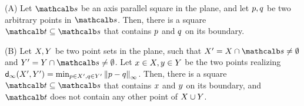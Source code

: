 \documentclass[12pt]{article}%
\begin{document}
\begin{lemma}
    (A) Let $\sqr$ be an axis parallel square in the plane, and let
    $p, q$ be two arbitrary points in $\sqr$. Then, there is a
    square $\sqrA \subseteq \sqr$ that contains $p$ and $q$ on its
    boundary.

    (B) Let $X, Y$ be two point sets in the plane, such that
    $\PSX' = \PSX \cap \sqr \neq \emptyset$ and
    $\PSY' = \PSY \cap \sqr \neq \emptyset$. Let
    $x \in X, y \in Y$ be the two points realizing
    $\dsZ{\infty}{\PSX'}{\PSY'} = \min_{\pa \in \PSX', \pb \in \PSY'}
    \dZ{\infty}{\pa}{\pb}$. Then, there is a square
    $\sqrA \subseteq \sqr$ that contains $x$ and $y$ on its
    boundary, and $\sqrA$ does not contain any other point of
    $X \cup Y$.
\end{lemma}
\end{document}
